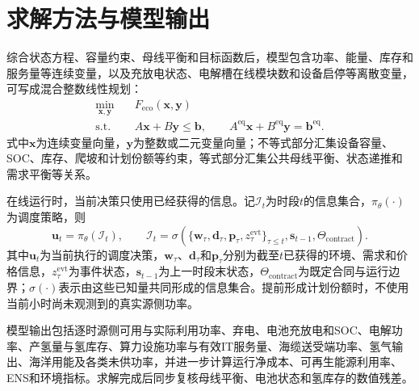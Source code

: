 \section{求解方法与模型输出}
\label{sec:solution}

综合状态方程、容量约束、母线平衡和目标函数后，模型包含功率、能量、库存和服务量等连续变量，以及充放电状态、电解槽在线模块数和设备启停等离散变量，可写成混合整数线性规划：
\begin{equation}
\begin{aligned}
\min_{\bm x,\bm y}\quad &F_{\mathrm{eco}}(\bm x,\bm y)\\
\mathrm{s.t.}\quad
&A\bm x+B\bm y\le\bm b,\qquad
A^{\mathrm{eq}}\bm x+B^{\mathrm{eq}}\bm y=\bm b^{\mathrm{eq}} .
\end{aligned}
\label{eq:milp-compact}
\end{equation}
式中$\bm x$为连续变量向量，$\bm y$为整数或二元变量向量；不等式部分汇集设备容量、SOC、库存、爬坡和计划份额等约束，等式部分汇集公共母线平衡、状态递推和需求平衡等关系。

在线运行时，当前决策只使用已经获得的信息。记$\mathcal I_t$为时段$t$的信息集合，$\pi_\theta(\cdot)$为调度策略，则
\begin{equation}
\bm u_t=\pi_{\theta}(\mathcal I_t),\qquad
\mathcal I_t=
\sigma\!\left(
\{\bm w_\tau,\bm d_\tau,\bm p_\tau,z_\tau^{\mathrm{evt}}\}_{\tau\le t},
\bm s_{t-1},\Theta_{\mathrm{contract}}
\right).
\label{eq:causal-policy}
\end{equation}
其中$\bm u_t$为当前执行的调度决策，$\bm w_\tau$、$\bm d_\tau$和$\bm p_\tau$分别为截至$t$已获得的环境、需求和价格信息，$z_\tau^{\mathrm{evt}}$为事件状态，$\bm s_{t-1}$为上一时段末状态，$\Theta_{\mathrm{contract}}$为既定合同与运行边界；$\sigma(\cdot)$表示由这些已知量共同形成的信息集合。提前形成计划份额时，不使用当前小时尚未观测到的真实源侧功率。

模型输出包括逐时源侧可用与实际利用功率、弃电、电池充放电和SOC、电解功率、产氢量与氢库存、算力设施功率与有效IT服务量、海缆送受端功率、氢气输出、海洋用能及各类未供功率，并进一步计算运行净成本、可再生能源利用率、ENS和环境指标。求解完成后同步复核母线平衡、电池状态和氢库存的数值残差。
